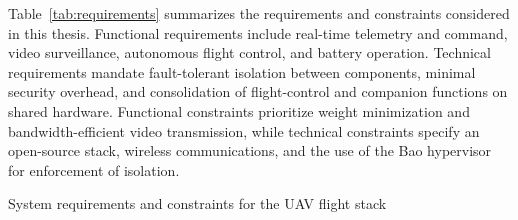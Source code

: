 Table~\ref{tab:requirements} summarizes the requirements and constraints
considered in this thesis. Functional requirements include real-time telemetry
and command, video surveillance, autonomous flight control, and battery
operation. Technical requirements mandate fault-tolerant isolation between
components, minimal security overhead, and consolidation of flight-control and
companion functions on shared hardware. Functional constraints prioritize weight
minimization and bandwidth-efficient video transmission, while technical
constraints specify an open-source stack, wireless communications, and the use
of the Bao hypervisor for enforcement of isolation.


\begin{table}[t]
  \centering
  \caption{System requirements and constraints for the UAV flight stack}
  \label{tab:requirements}

  \begingroup
  \small %
  \setlength{\tabcolsep}{6pt}     %
  \renewcommand{\arraystretch}{1.05} %


\end{table}
